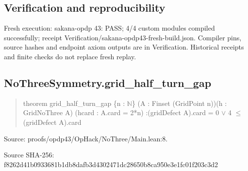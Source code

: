 \documentclass[11pt,a4paper]{article}
\begin{document}
\subsection{Verification and reproducibility}
Fresh execution: sakana-opdp 43: PASS; 4/4 custom modules compiled successfully; receipt Verification/sakana-opdp43-fresh-build.json. Compiler pins, source hashes and endpoint axiom outputs are in Verification. Historical receipts and finite checks do not replace fresh replay.

\begin{samepage}
\subsection{NoThreeSymmetry.grid\_half\_turn\_gap}
\begin{quote}\small\ttfamily theorem grid\_half\_turn\_gap \{n : \ensuremath{\mathbb{N}}\} (A : Finset (GridPoint n))\newline     (h : GridNoThree A) (hcard : A.card = 2*n) :\newline     (gridDefect A).card = 0 \ensuremath{\vee} 4 \ensuremath{\leq} (gridDefect A).card\end{quote}
{\small Source: proofs/opdp43/OpHack/NoThree/Main.lean:8.\par}

{\small Source SHA-256: f8262d41b0933681b1db8dafb3d4302471dc28650b8ca950e3e1fc01f203c3d2\par}

\end{samepage}
\end{document}
